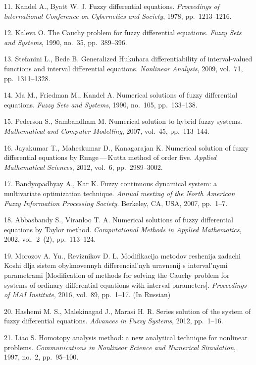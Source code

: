 {%
11. Kandel A., Byatt W. J. {Fuzzy differential equations}. \emph{Proceedings of lnternational Conference on Cybernetics and Society}, 1978, pp.~1213--1216.

12. Kaleva O. The Cauchy problem for fuzzy differential equations. \emph{Fuzzy Sets and Systems}, 1990, no.~35, pp.~389--396.

13. Stefanini L., Bede B. Generalized Hukuhara differentiability of interval-valued functions and interval differential equations. \emph {Nonlinear Analysis}, 2009, vol.~71, pp.~1311--1328.

14. Ma M., Friedman M., Kandel A. Numerical solutions of fuzzy differential equations. \emph{Fuzzy Sets and Systems}, 1990, no.~105, pp.~133--138.

15. Pederson S., Sambandham M. Numerical solution to hybrid fuzzy systems. \emph{Mathematical and Computer Modelling}, 2007, vol.~45, pp.~113--144.

16. Jayakumar T., Maheskumar D., Kanagarajan K. Numerical solution of fuzzy differential equations by Runge\,---\,Kutta method of order five. \emph{Applied Mathematical Sciences}, 2012, vol.~6, pp.~2989--3002.

17. Bandyopadhyay A., Kar K. Fuzzy continuous dynamical system: a multivariate optimization technique. \emph{Annual meeting of the North American Fuzzy Information Processing Society}. Berkeley, CA, USA, 2007, pp.~1--7.

18. Abbasbandy S., Viranloo T. A. Numerical solutions of fuzzy differential equations by Taylor method. \emph{Computational Methods in Applied Mathematics}, 2002, vol.~2~(2), pp.~113--124.

19. Morozov A. Yu., Reviznikov D. L. Modifikacija metodov reshenija zadachi Koshi dlja sistem obyknovennyh differencial'nyh uravnenij s interval'nymi parametrami [Modification of methods for solving the Cauchy problem for systems of ordinary differential equations with interval parameters]. \emph{Proceedings of MAI Institute}, 2016, vol.~89, pp.~1--17. (In Russian)

20. Hashemi M. S., Malekinagad J., Marasi H. R. Series solution of the system of fuzzy differential equations. \emph{Advances in Fuzzy Systems}, 2012, pp.~1--16.

21. Liao S. Homotopy analysis method: a new analytical technique for nonlinear problems. \emph{Communications in Nonlinear Science and Numerical Simulation}, 1997, no.~2, pp.~95--100.

}
